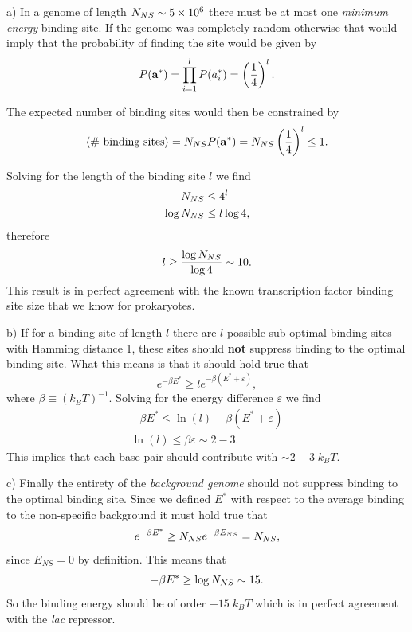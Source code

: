 a) In a genome of length $N_{NS} \sim 5\times 10^6$ there must be at most one
{\it minimum energy} binding site. If the genome was completely random
otherwise that would imply that the probability of finding the site would be
given by
\begin{equation}
  P(\mathbf{a}^*) = \prod_{i=1}^l P(a_i^*) = \left( {1 \over 4} \right)^l.
\end{equation}

The expected number of binding sites would then be constrained by
\begin{equation}
  \left\langle \text{\# binding sites} \right\rangle = N_{NS} P(\mathbf{a}^*)
   = N_{NS} \left( {1 \over 4} \right)^l \leq 1.
\end{equation}

Solving for the length of the binding site $l$ we find
\begin{align}
  N_{NS} &\leq 4^l\\
  \log N_{NS} &\leq l \log 4,
\end{align}
therefore
\begin{equation}
  l \geq {\log N_{NS}\over \log 4} \sim 10.
\end{equation}
This result is in perfect agreement with the known transcription factor binding
site size that we know for prokaryotes.

b) If for a binding site of length $l$ there are $l$ possible sub-optimal
binding sites with Hamming distance 1, these sites should \textbf{not} suppress
binding to the optimal binding site. What this means is that it should hold
true that
\begin{equation}
  e^{-\beta E^*} \geq l e^{-\beta (E^* + \varepsilon)},
\end{equation}
where $\beta \equiv (k_BT)^{-1}$. Solving for the energy difference
$\varepsilon$ we find
\begin{align}
  -\beta E^* \leq \ln (l) - \beta (E^* + \varepsilon)\\
  \ln (l) \leq \beta \varepsilon \sim 2-3.
\end{align}
This implies that each base-pair should contribute with $\sim 2-3 \; k_BT$.

c) Finally the entirety of the {\it background genome} should not suppress
binding to the optimal binding site. Since we defined $E^*$ with respect to the
average binding to the non-specific background it must hold true that
\begin{equation}
  e^{-\beta E^*} \geq N_{NS} e^{-\beta E_{NS}} = N_{NS},
\end{equation}
since $E_{NS} = 0$ by definition.
This means that
\begin{equation}
  -\beta E^* \geq \log N_{NS} \sim 15.
\end{equation}
So the binding energy should be of order $-15 \; k_BT$ which is in perfect
agreement with the {\it lac} repressor.

